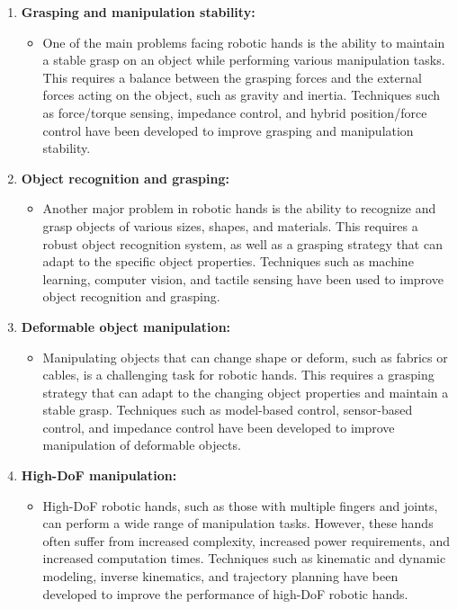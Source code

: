 \documentclass[12pt, twoside]{report}
\begin{document}
\begin{enumerate}
       \item \textbf{Grasping and manipulation stability:}
    \begin{itemize}
        \item One of the main problems facing robotic hands is the ability to maintain a stable grasp on an object while performing various manipulation tasks. This requires a balance between the grasping forces and the external forces acting on the object, such as gravity and inertia. Techniques such as force/torque sensing, impedance control, and hybrid position/force control have been developed to improve grasping and manipulation stability.
    \end{itemize} 
     \item \textbf{Object recognition and grasping:}
    \begin{itemize}
        \item Another major problem in robotic hands is the ability to recognize and grasp objects of various sizes, shapes, and materials. This requires a robust object recognition system, as well as a grasping strategy that can adapt to the specific object properties. Techniques such as machine learning, computer vision, and tactile sensing have been used to improve object recognition and grasping.
    \end{itemize} 
         \item \textbf{Deformable object manipulation:}
    \begin{itemize}
        \item Manipulating objects that can change shape or deform, such as fabrics or cables, is a challenging task for robotic hands. This requires a grasping strategy that can adapt to the changing object properties and maintain a stable grasp. Techniques such as model-based control, sensor-based control, and impedance control have been developed to improve manipulation of deformable objects.
    \end{itemize} 
            \item \textbf{High-DoF manipulation:}
    \begin{itemize}
        \item High-DoF robotic hands, such as those with multiple fingers and joints, can perform a wide range of manipulation tasks. However, these hands often suffer from increased complexity, increased power requirements, and increased computation times. Techniques such as kinematic and dynamic modeling, inverse kinematics, and trajectory planning have been developed to improve the performance of high-DoF robotic hands.
    \end{itemize} 
\end{enumerate}
\end{document}
